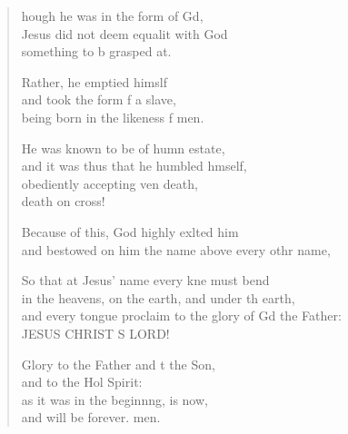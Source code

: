 \settowidth{\versewidth}{and every tongue proclaim to the glory of God the Father: *}
\begin{verse}%
  \begin{patverse}
    hough he was in the form of Gd,\Flex\\
    Jesus did not deem equalit with God\Med\\
    something to b grasped at.
    
    Rather, he emptied himslf\Flex\\
    and took the form f a slave,\Med\\
    being born in the likeness f men.
    
    He was known to be of humn estate,\Med\\
    and it was thus that he humbled h\pointup{\i}mself,\\
    obediently accepting ven death,\Med\\
    death on  cross!
    
    Because of this, God highly exlted him\Med\\
    and bestowed on him the name above every othr name,
    
    So that at Jesus’ name every kne must bend\Med\\
    in the heavens, on the earth, and under th earth,\\
    and every tongue proclaim to the glory of Gd the Father:\Med\\
    JESUS CHRIST S LORD!

    Glory to the Father and t the Son,\Med\\
    and to the Hol Spirit:\\
    as it was in the beginn\pointup{\i}ng, is now,\Med\\
    and will be forever. men.
  \end{patverse}
\end{verse}
